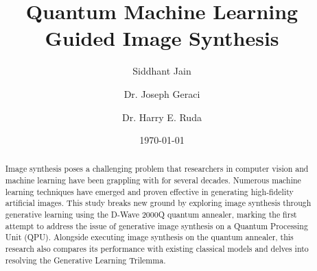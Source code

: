 \documentclass[%
 reprint,
 amsmath,amssymb,
 aps,
]{revtex4-2}
\begin{document}

\title{Quantum Machine Learning Guided Image Synthesis}%

\author{Siddhant Jain}

 


\author{Dr. Joseph Geraci}
%
%
%
%

\author{Dr. Harry E. Ruda}


\date{\today}

\begin{abstract}
\noindent
Image synthesis poses a challenging problem that researchers in computer vision and machine learning have been grappling with for several decades. Numerous machine learning techniques have emerged and proven effective in generating high-fidelity artificial images. This study breaks new ground by exploring image synthesis through generative learning using the D-Wave 2000Q quantum annealer, marking the first attempt to address the issue of generative image synthesis on a Quantum Processing Unit (QPU). Alongside executing image synthesis on the quantum annealer, this research also compares its performance with existing classical models and delves into resolving the Generative Learning Trilemma.
\end{abstract}
\end{document}
